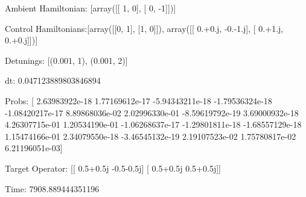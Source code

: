 \documentclass{article}
\begin{document}
    

\newpage

Ambient Hamiltonian: [array([[ 1,  0],
       [ 0, -1]])]

Control Hamiltonians:[array([[0, 1],
       [1, 0]]), array([[ 0.+0.j, -0.-1.j],
       [ 0.+1.j,  0.+0.j]])]

Detunings: [(0.001, 1), (0.001, 2)]

 dt: 0.047123889803846894

Probs: [  2.63983922e-18   1.77169612e-17  -5.94343211e-18  -1.79536324e-18
  -1.08420217e-17   8.89868036e-02   2.02996330e-01  -8.59619792e-19
   3.69000932e-18   4.26307715e-01   1.20534190e-01  -1.06268637e-17
  -1.29801811e-18  -1.68557129e-18   1.15474166e-01   2.34079550e-18
  -3.46545132e-19   2.19107523e-02   1.75780817e-02   6.21196051e-03]

Target Operator: [[ 0.5+0.5j -0.5-0.5j]
 [ 0.5+0.5j  0.5+0.5j]]

Time: 7908.889444351196
\end{document}
